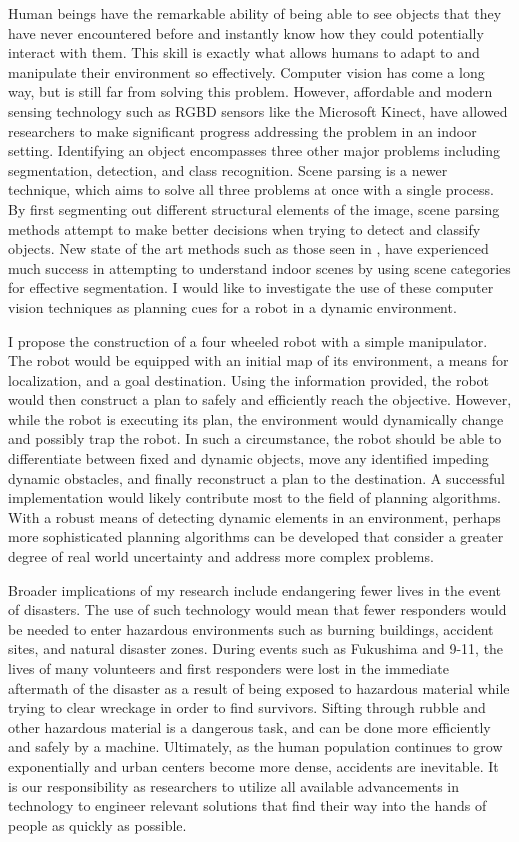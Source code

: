 \documentclass[12pt]{article}
\begin{document}
Human beings have the remarkable ability of being able to see objects that they
have never encountered before and instantly know how they could potentially
interact with them. This skill is exactly what allows humans to adapt to and
manipulate their environment so effectively. Computer vision has come a long
way, but is still far from solving this problem. However, affordable and modern
sensing technology such as RGBD sensors like the Microsoft Kinect, have allowed
researchers to make significant progress addressing the problem in an indoor
setting.  Identifying an object encompasses three other major problems
including segmentation, detection, and class recognition. Scene parsing is a
newer technique, which aims to solve all three problems at once with a single
process. By first segmenting out different structural elements of the image,
scene parsing methods attempt to make better decisions when trying to detect
and classify objects. New state of the art methods such as those seen in
\cite{gupta}, have experienced much success in attempting to understand indoor
scenes by using scene categories for effective segmentation. I would like to
investigate the use of these computer vision techniques as planning cues for a
robot in a dynamic environment.

I propose the construction of a four wheeled robot with a simple manipulator.
The robot would be equipped with an initial map of its environment, a means for
localization, and a goal destination. Using the information provided, the robot
would then construct a plan to safely and efficiently reach the objective.
However, while the robot is executing its plan, the environment would
dynamically change and possibly trap the robot.  In such a circumstance, the
robot should be able to differentiate between fixed and dynamic objects, move
any identified impeding dynamic obstacles, and finally reconstruct a plan to
the destination. A successful implementation would likely contribute most to
the field of planning algorithms. With a robust means of detecting dynamic
elements in an environment, perhaps more sophisticated planning algorithms can
be developed that consider a greater degree of real world uncertainty and
address more complex problems.

Broader implications of my research include endangering fewer lives in the
event of disasters. The use of such technology would mean that fewer responders
would be needed to enter hazardous environments such as burning buildings,
accident sites, and natural disaster zones. During events such as Fukushima and
9-11, the lives of many volunteers and first responders were lost in the
immediate aftermath of the disaster as a result of being exposed to hazardous
material while trying to clear wreckage in order to find survivors. Sifting
through rubble and other hazardous material is a dangerous task, and can be
done more efficiently and safely by a machine. Ultimately, as the human
population continues to grow exponentially and urban centers become more dense,
accidents are inevitable. It is our responsibility as researchers to utilize
all available advancements in technology to engineer relevant solutions that
find their way into the hands of people as quickly as possible.
\end{document}
